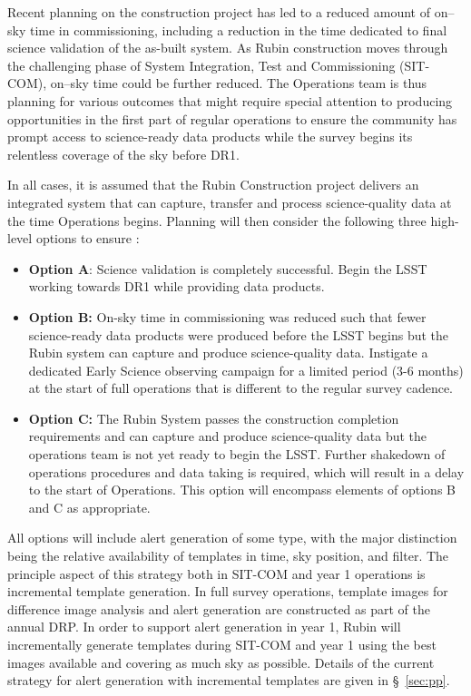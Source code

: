 Recent planning on the construction project has led to a reduced amount of on--sky time in commissioning, including a reduction in the time dedicated to final science validation of the as-built system. 
As Rubin construction moves through the challenging phase of System Integration, Test and Commissioning (SIT-COM), on--sky time could be further reduced. 
The Operations team is thus planning for various outcomes that might require special attention to producing \es opportunities in the first part of regular operations to ensure the community has prompt access to science-ready data products while the survey begins its relentless coverage of the sky before DR1.

In all cases, it is assumed that the Rubin Construction project delivers an integrated system that can capture, transfer and process science-quality data at the time Operations begins.
Planning will then consider the following three high-level options to ensure \es:
\begin{itemize}
\item \textbf{Option A}: 
Science validation is completely successful.
Begin the LSST working towards DR1 while providing \es data products. 
\item \textbf{Option B:} 
On-sky time in commissioning was reduced such that fewer science-ready data products were produced before the LSST begins but the Rubin system can capture and produce science-quality data. 
Instigate a dedicated Early Science observing campaign for a limited period (3-6 months) at the start of full operations that is different to the regular survey cadence. 
\item \textbf{Option C:} 
The Rubin System  passes the construction completion requirements and can capture and produce science-quality data but the operations team is not yet ready to begin the LSST. 
Further shakedown of operations procedures and data taking is required, which will result in a delay to the start of Operations. 
This option will encompass elements of options B and C as appropriate. 
\end{itemize}

All options will include alert generation of some type, with the major distinction being the relative availability of templates in time, sky position, and filter. 
The principle aspect of this strategy both  in SIT-COM and year 1 operations is incremental template generation. 
In full survey operations, template images for difference image analysis and alert generation are constructed as part of the annual DRP. 
In order to support alert generation in year 1, Rubin will incrementally generate templates during SIT-COM and year 1 using the best images available and covering as much sky as possible. 
Details of the current strategy for alert generation  with incremental templates are given in  \S~\ref{sec:pp}.  

